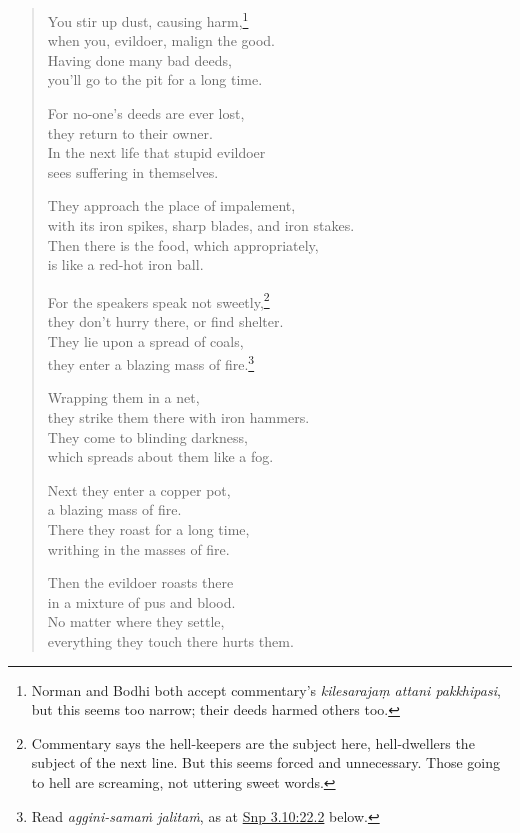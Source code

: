 \documentclass[12pt,openany]{book}%
\begin{document}
\begin{verse}
You stir up dust, causing harm,\footnote{Norman and Bodhi both accept commentary’s \textit{kilesarajaṃ attani pakkhipasi}, but this seems too narrow; their deeds harmed others too. } \\
when you, evildoer, malign the good. \\
Having done many bad deeds, \\
you’ll go to the pit for a long time. 

For no-one’s deeds are ever lost, \\
they return to their owner. \\
In the next life that stupid evildoer \\
sees suffering in themselves. 

They approach the place of impalement, \\
with its iron spikes, sharp blades, and iron stakes. \\
Then there is the food, which appropriately, \\
is like a red-hot iron ball. 

For the speakers speak not sweetly,\footnote{Commentary says the hell-keepers are the subject here, hell-dwellers the subject of the next line. But this seems forced and unnecessary. Those going to hell are screaming, not uttering sweet words. } \\
they don’t hurry there, or find shelter. \\
They lie upon a spread of coals, \\
they enter a blazing mass of fire.\footnote{Read \textit{aggini-\textsanskrit{samaṁ} \textsanskrit{jalitaṁ}}, as at \href{https://suttacentral.net/snp3.10/en/sujato\#22.2}{Snp 3.10:22.2} below. } 

Wrapping them in a net, \\
they strike them there with iron hammers. \\
They come to blinding darkness, \\
which spreads about them like a fog. 

Next they enter a copper pot, \\
a blazing mass of fire. \\
There they roast for a long time, \\
writhing in the masses of fire. 

Then the evildoer roasts there \\
in a mixture of pus and blood. \\
No matter where they settle, \\
everything they touch there hurts them. 


\end{verse}
\end{document}
